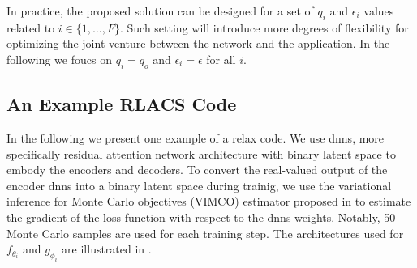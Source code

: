 \begin{remark}\label{rem:vectorepsilon}
    In practice, the proposed solution can be designed for a set of $q_i$ and $\epsilon_i$ values related to $i \in \{1,\ldots,F\}$. Such setting will introduce more degrees of flexibility for optimizing the joint venture between the network and the application. In the following we foucs on $q_i = q_o$ and $\epsilon_i = \epsilon$ for all $i$.
\end{remark}








\subsection{An Example RLACS Code}
\label{sec:examplerlacs}

In the following we present one example of a \gls{relax} code. We use \glspl{dnn}, more specifically  residual attention network architecture \cite{wang2017residual} with binary latent space to embody the encoders and decoders. To convert the real-valued  output of the  encoder \glspl{dnn} into a binary latent space during trainig,  we use the  variational inference for Monte Carlo objectives (VIMCO) estimator  proposed in \cite{mnih16_variat_monte_carlo}   to estimate the gradient of the loss function with respect to the \glspl{dnn} weights. Notably, 50 Monte Carlo samples are used for each training step. The architectures  used for $f_{\theta_i}$  and  $g_{\phi_i}$ are illustrated in .%

